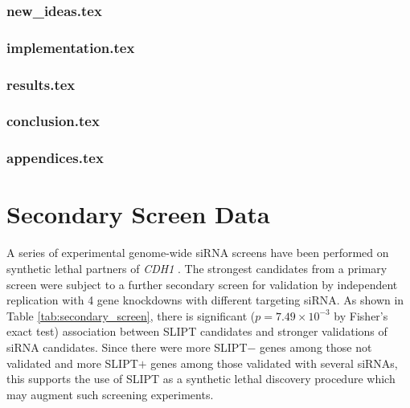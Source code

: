 \subsection{new\_ideas.tex}

\subsection{implementation.tex}

\subsection{results.tex}

\subsection{conclusion.tex}

\subsection{appendices.tex}


\fi

\chapter{Secondary Screen Data}
\label{appendix:secondary_screen}

A series of experimental genome-wide siRNA screens have been performed on synthetic lethal partners of \textit{CDH1} \citep{Telford2015}. The strongest candidates from a primary screen were subject to a further secondary screen for validation by independent replication with 4 gene knockdowns with different targeting siRNA. As shown in Table \ref{tab:secondary_screen}, there is significant ($p=7.49 \times 10^{-3}$ by Fisher's exact test) %
association between SLIPT candidates and stronger validations of siRNA candidates. Since there were more SLIPT$-$ genes among those not validated and more SLIPT$+$ genes among those validated with several siRNAs, this supports the use of SLIPT as a synthetic lethal discovery procedure which may augment such screening experiments.

